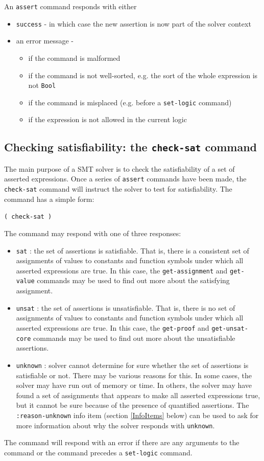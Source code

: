 \documentclass[12pt,oneside]{report}
\newcommand{\nospace}{\setlength{\itemsep}{0in}\setlength{\parsep}{0in}\setlength{\parskip}{0in}\setlength{\topsep}{0in}}
\begin{document}
An {\tt assert} command responds with either 
\begin{itemize} \nospace
\item {\tt success} - in which case the new assertion is now part of the solver context
\item an error message -
\begin{itemize} \nospace
\item if the command is malformed
\item if the command is not well-sorted, e.g. the sort of the whole expression is not {\tt Bool}
\item if the command is misplaced (e.g. before a {\tt set-logic} command)
\item if the expression is not allowed in the current logic
\end{itemize}
\end{itemize}

\subsection{Checking satisfiability: the {\tt check-sat} command}

The main purpose of a SMT solver is to check the satisfiability of a set of asserted expressions.  Once a series of {\tt assert}
commands have been made, the {\tt check-sat} command will instruct the solver to test for satisfiability.  The command has a simple form:\\
\centerline{\tt ( check-sat )}

The command may respond with one of three responses:
\begin{itemize}
\item {\tt sat} : the set of assertions is satisfiable.  That is, there is a consistent set of assignments of values to constants and function
symbols under which all asserted expressions are true. In this case, the {\tt get-assignment} and {\tt get-value} commands may be used to
find out more about the satisfying assignment.
\item {\tt unsat} : the set of assertions is unsatisfiable. That is, there is no set of assignments of values to constants and function
symbols under which all asserted expressions are true. In  this case, the {\tt get-proof} and {\tt get-unsat-core} commands may be used to
find out more about the unsatisfiable assertions.
\item {\tt unknown} : solver cannot determine for sure whether the set of assertions is satisfiable or not.  There may be various reasons for
this. In some cases, the solver may have run out of memory or time. In others, the solver may have found a set of assignments that appears to
make all asserted expressions true, but it cannot be sure because of the presence of quantified assertions. The {\tt :reason-unknown} info item
(section \ref{InfoItems} below) can be used to ask for more information about why the solver responds with {\tt unknown}.
\end{itemize}
\noindent
The command will respond with an error if there are any arguments to the command or the command precedes a {\tt set-logic} command.
\end{document}
